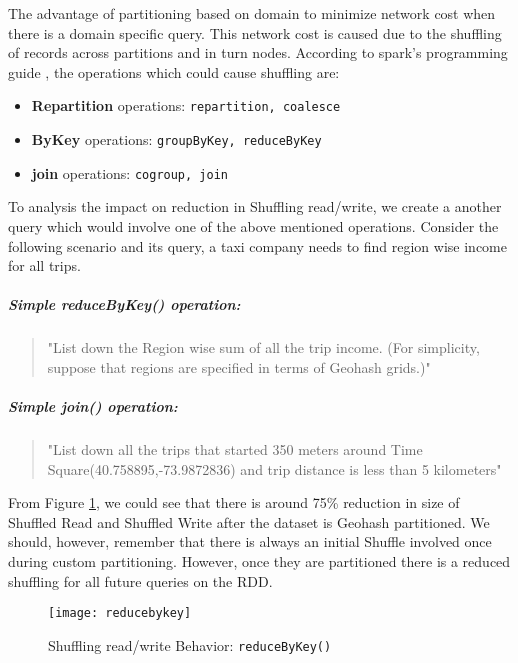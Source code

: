 \documentclass[article,type=msc,colorback,12pt,accentcolor=tud1d]{tudthesis}
\begin{document}
			The advantage of partitioning based on domain to minimize network cost when there is a domain specific query. This network cost is caused due to the shuffling of records across partitions and in turn nodes. According to spark's programming guide \cite{sparkKV}, the operations which could cause shuffling are:
			\begin{itemize}
				\item \textbf{Repartition} operations: \texttt{repartition, coalesce}
				\item \textbf{ByKey} operations: \texttt{groupByKey, reduceByKey}
				\item \textbf{join} operations: \texttt{cogroup, join}
			\end{itemize}
			
			To analysis the impact on reduction in Shuffling read/write, we create a another query which would involve one of the above mentioned operations. Consider the following scenario and its query, a taxi company needs to find region wise income for all trips.
			
				\subparagraph{Simple \textit{reduceByKey() } operation:}
			\begin{quote}
				"List down the Region wise sum of all the trip income. (For simplicity, suppose that regions are specified in terms of Geohash grids.)"
			\end{quote}	
			\subparagraph{Simple \textit{join()} operation:}
			\begin{quote}
				"List down all the trips that started 350 meters around Time Square(40.758895,-73.9872836) and trip distance is less than 5 kilometers"
			\end{quote}	
			
			From Figure \ref{fig:reducebykey}, we could see that there is around 75\% reduction in size of Shuffled Read and Shuffled Write after the dataset is Geohash partitioned. We should, however, remember that there is always an initial Shuffle involved once during custom partitioning. However, once they are partitioned there is a reduced shuffling for all future queries on the RDD. 
			
				\begin{figure}[h]
					\centering
					\texttt{[image: reducebykey]}
					\caption{Shuffling read/write Behavior: \texttt{reduceByKey()}} 
					\label{fig:reducebykey}
				\end{figure}
				
\end{document}
